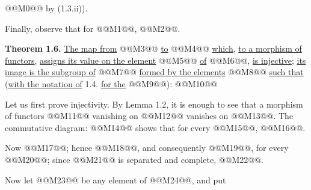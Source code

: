 @@M0@@ by (1.3.ii)).

Finally, observe that for @@M1@@, @@M2@@.

\textbf{Theorem 1.6.} \uline{The map from} @@M3@@ \uline{to} @@M4@@ \uline{which}, \uline{to a morphism of functors}, \uline{assigns its value on the element} @@M5@@ \uline{of} @@M6@@, \uline{is injective}; \uline{its image is the subgroup of} @@M7@@ \uline{formed by the elements} @@M8@@ \uline{such that} (\uline{with the notation of} 1.4. \uline{for the} @@M9@@):
@@M10@@

Let us first prove injectivity. By Lemma 1.2, it is enough to see that a morphism of functors @@M11@@ vanishing on @@M12@@ vanishes on @@M13@@. The commutative diagram:
@@M14@@
shows that for every @@M15@@, @@M16@@.

Now @@M17@@; hence @@M18@@, and consequently @@M19@@, for every @@M20@@; since @@M21@@ is separated and complete, @@M22@@.

Now let @@M23@@ be any element of @@M24@@, and put
